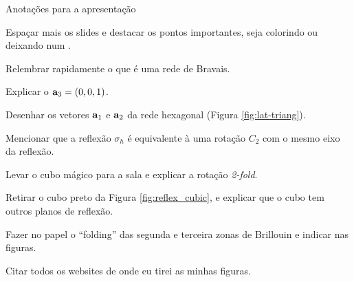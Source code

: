 \documentclass[aspectratio=169]{beamer}
\begin{document}


\begin{frame}{Anotações para a apresentação}

Espaçar mais os slides e destacar os pontos importantes, seja colorindo ou deixando num .

Relembrar rapidamente o que é uma rede de Bravais.

Explicar o $\vb{a}_3 = (0, 0, 1)$.

Desenhar os vetores $\vb{a}_1$ e $\vb{a}_2$ da rede hexagonal (Figura \ref{fig:lat-triang}).

Mencionar que a reflexão $\sigma_h$ é equivalente à uma rotação $C_2$ com o mesmo eixo da reflexão.

Levar o cubo mágico para a sala e explicar a rotação \textit{2-fold}.

Retirar o cubo preto da Figura \ref{fig:reflex_cubic}, e explicar que o cubo tem outros planos de reflexão.

Fazer no papel o ``folding'' das segunda e terceira zonas de Brillouin e indicar nas figuras.

Citar todos os websites de onde eu tirei as minhas figuras.

\end{frame}
\end{document}
